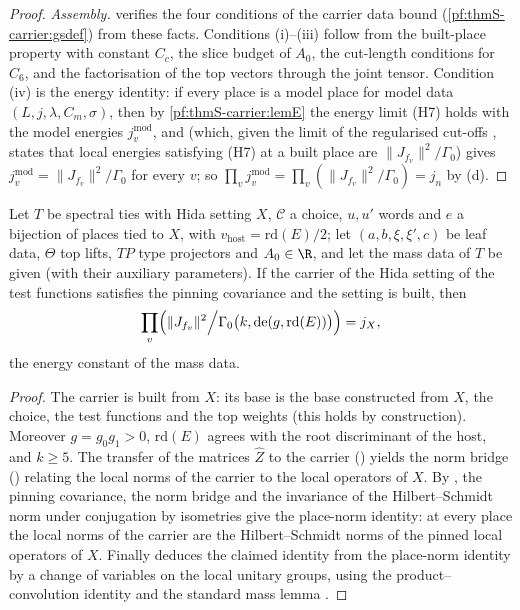 \begin{proof}
\emph{Assembly.}  verifies the four conditions of the
carrier data bound (\cref{pf:thmS-carrier:gsdef}) from these facts. Conditions (i)--(iii) follow from the built-place property
with constant $C_c$, the slice budget of $A_0$, the cut-length conditions for $C_6$, and the factorisation of the top vectors
through the joint tensor. Condition (iv) is the energy identity: if every place is a model place for model data
$(L,j,\lambda,C_m,\sigma)$, then by \cref{pf:thmS-carrier:lemE} the energy limit (H7) holds with the model energies
$j^{\mathrm{mod}}_v$, and  (which, given the limit of the
regularised cut-offs , states that local energies satisfying (H7) at a
built place are $\|J_{f_v}\|^2/\Gamma_0$) gives $j^{\mathrm{mod}}_v=\|J_{f_v}\|^2/\Gamma_0$ for every $v$; so
$\prod_vj^{\mathrm{mod}}_v=\prod_v(\|J_{f_v}\|^2/\Gamma_0)=j_n$ by (d).
\end{proof}

\begin{theorem}\label{pf:thmS-carrier:energycpt}
Let $T$ be spectral ties with Hida setting $X$, $\mathcal C$ a choice, $u,u'$ words and $e$ a bijection of places tied to $X$,
with $v_{\mathrm{host}}=\mathrm{rd}(E)/2$; let $(a,b,\xi,\xi',c)$ be leaf data, $\Theta$ top lifts, $TP$ type projectors and
$A_0\in\R$, and let the mass data of $T$ be given (with their auxiliary parameters). If the carrier of the Hida setting of the
test functions satisfies the pinning covariance and the setting is built, then
\[
\prod_v\Bigl(\|J_{f_v}\|^2\Big/\Gamma_0\bigl(k,\mathrm{de}(g,\mathrm{rd}(E))\bigr)\Bigr)=j_X,
\]
the energy constant of the mass data.
\end{theorem}

\begin{proof}
The carrier is built from $X$: its base is the base constructed from $X$, the choice, the test functions and the top weights
(this holds by construction). Moreover $g=g_0g_1>0$, $\mathrm{rd}(E)$ agrees with the root discriminant of the host, and $k\ge5$.
The transfer of the matrices $\hat Z$ to the carrier () yields the norm
bridge () relating the local norms of the carrier to
the local operators of $X$. By , the pinning covariance, the
norm bridge and the invariance of the Hilbert--Schmidt norm under conjugation by isometries give the place-norm identity: at
every place the local norms of the carrier are the Hilbert--Schmidt norms of the pinned local operators of $X$. Finally
 deduces the claimed identity from the place-norm
identity by a change of variables on the local unitary groups, using the product--convolution identity
 and the standard mass lemma
.
\end{proof}

